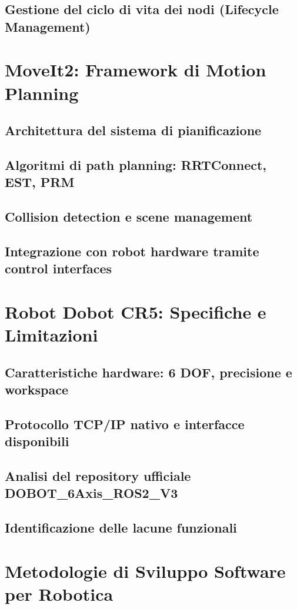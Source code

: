 \documentclass[12pt,a4paper,twoside,openright]{book}
\begin{document}
	\subsection{Gestione del ciclo di vita dei nodi (Lifecycle Management)}
	
	\section{MoveIt2: Framework di Motion Planning}
	\subsection{Architettura del sistema di pianificazione}
	\subsection{Algoritmi di path planning: RRTConnect, EST, PRM}
	\subsection{Collision detection e scene management}
	\subsection{Integrazione con robot hardware tramite control interfaces}
	
	\section{Robot Dobot CR5: Specifiche e Limitazioni}
	\subsection{Caratteristiche hardware: 6 DOF, precisione e workspace}
	\subsection{Protocollo TCP/IP nativo e interfacce disponibili}
	\subsection{Analisi del repository ufficiale DOBOT\_6Axis\_ROS2\_V3}
	\subsection{Identificazione delle lacune funzionali}
	
	\section{Metodologie di Sviluppo Software per Robotica}
\end{document}
